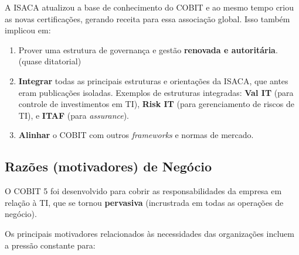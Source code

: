 \documentclass[
]{book}
\providecommand{\tightlist}{%
  \setlength{\itemsep}{0pt}\setlength{\parskip}{0pt}}
\begin{document}
A ISACA atualizou a base de conhecimento do COBIT e ao mesmo tempo criou as novas certificações, gerando receita para essa associação global. Isso também implicou em:

\begin{enumerate}
\def\labelenumi{\arabic{enumi}.}
\tightlist
\item
  Prover uma estrutura de governança e gestão \textbf{renovada e autoritária}. (quase ditatorial)
\item
  \textbf{Integrar} todas as principais estruturas e orientações da ISACA, que antes eram publicações isoladas. Exemplos de estruturas integradas: \textbf{Val IT} (para controle de investimentos em TI), \textbf{Risk IT} (para gerenciamento de riscos de TI), e \textbf{ITAF} (para \emph{assurance}).
\item
  \textbf{Alinhar} o COBIT com outros \emph{frameworks} e normas de mercado.
\end{enumerate}

\subsection{Razões (motivadores) de Negócio}\label{razuxf5es-motivadores-de-neguxf3cio}

O COBIT 5 foi desenvolvido para cobrir as responsabilidades da empresa em relação à TI, que se tornou \textbf{pervasiva} (incrustrada em todas as operações de negócio).

Os principais motivadores relacionados às necessidades das organizações incluem a pressão constante para:
\end{document}
